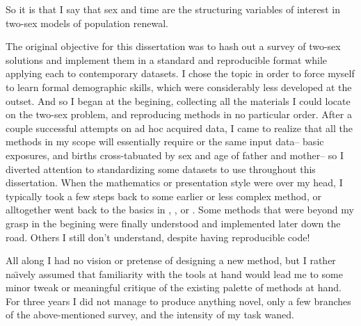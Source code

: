 So it is that I say that sex and time
are the structuring variables of interest in two-sex models of population
renewal.

The original objective for this dissertation was to hash out a survey of two-sex
solutions and implement them in a standard and reproducible format while
applying each to contemporary datasets. I chose the topic in order to force
myself to learn formal demographic skills, which were considerably less
developed at the outset. And so I began at the begining, collecting
all the materials I could locate on the two-sex problem, and reproducing methods
in no particular order. After a couple successful attempts on ad hoc acquired
data, I came to realize that all the methods in my scope will essentially
require or the same input data-- basic exposures, and births cross-tabuated by
sex and age of father and mother-- so I diverted attention to standardizing some
datasets to use throughout this dissertation. When the mathematics or
presentation style were over my head, I typically took a few steps back to some 
earlier or less complex method, or alltogether went back to the basics 
in \citet{sharpe1911problem}, \citet{kuczynski1932fertility}, \citet{coale1972growth} 
or \citet{caswell2001matrix}. Some methods that were beyond my grasp in the 
begining \citep[e.g.][]{mitra1978derivation} were finally understood and implemented later down the road. 
Others I still don't understand\cite[e.g.][]{choo2006estimating}, despite having
reproducible code!

All along I had no vision or pretense of designing a new method, but I rather
na\"{\i}vely assumed that familiarity with the tools at hand would lead me to
some minor tweak or meaningful critique of the existing palette of methods at
hand. For three years I did not manage to produce anything novel, only a few
branches of the above-mentioned survey, and the intensity of my task waned.


